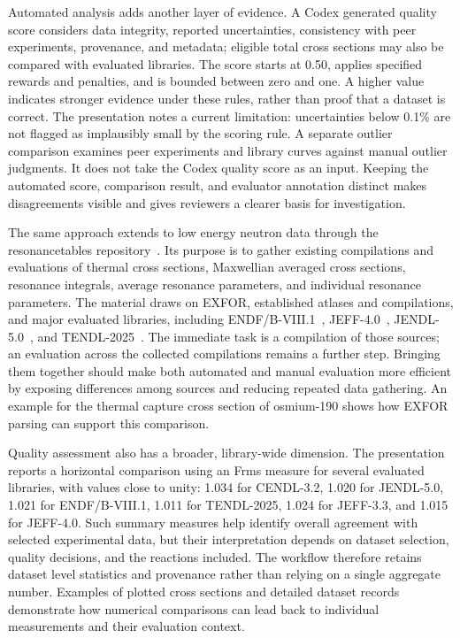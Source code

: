 Automated analysis adds another layer of evidence. A Codex generated quality score considers data integrity, 
reported uncertainties, consistency with peer experiments, provenance, and metadata; 
eligible total cross sections may also be compared with evaluated libraries. 
The score starts at 0.50, applies specified rewards and penalties, and is bounded between zero and one. 
A higher value indicates stronger evidence under these rules, rather than proof that a dataset is correct. 
The presentation notes a current limitation: uncertainties below 0.1\% are not flagged as implausibly small 
by the scoring rule. A separate outlier comparison examines peer experiments and library curves against 
manual outlier judgments. It does not take the Codex quality score as an input. Keeping the automated score, 
comparison result, and evaluator annotation distinct makes disagreements visible and gives reviewers a clearer 
basis for investigation.

The same approach extends to low energy neutron data through the resonancetables repository~\cite{resonancetables}. Its purpose is to 
gather existing compilations and evaluations of thermal cross sections, Maxwellian averaged cross sections, 
resonance integrals, average resonance parameters, and individual resonance parameters. 
The material draws on EXFOR, established atlases and compilations, and major evaluated libraries, 
including ENDF/B-VIII.1~\cite{ENDFB8.1}, JEFF-4.0~\cite{JEFF40}, JENDL-5.0~\cite{Iwamoto2023JENDL5}, and TENDL-2025~\cite{TENDL}. 
The immediate task is a compilation of those sources; an evaluation across the collected compilations remains 
a further step. Bringing them together should make both automated and manual evaluation more efficient by 
exposing differences among sources and reducing repeated data gathering. 
An example for the thermal capture cross section of osmium-190 shows how EXFOR parsing can support this comparison.

Quality assessment also has a broader, library-wide dimension. The presentation reports a horizontal comparison 
using an Frms measure for several evaluated libraries, with values close to unity: 
1.034 for CENDL-3.2, 1.020 for JENDL-5.0, 1.021 for ENDF/B-VIII.1, 1.011 for TENDL-2025, 1.024 for JEFF-3.3, and 
1.015 for JEFF-4.0. Such summary measures help identify overall agreement with selected experimental data, 
but their interpretation depends on dataset selection, quality decisions, and the reactions included. 
The workflow therefore retains dataset level statistics and provenance rather than relying on a single aggregate number. 
Examples of plotted cross sections and detailed dataset records demonstrate how numerical comparisons can lead 
back to individual measurements and their evaluation context.

